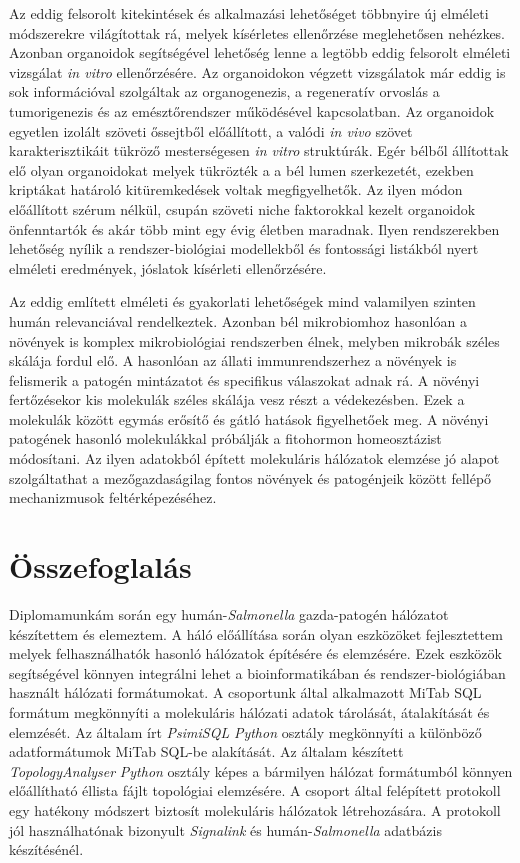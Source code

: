 \documentclass[a4paper,12pt]{article}
\begin{document}
		Az eddig felsorolt kitekintések és alkalmazási lehetőséget többnyire új elméleti módszerekre világítottak rá, melyek kísérletes ellenőrzése meglehetősen nehézkes. Azonban organoidok segítségével lehetőség lenne a legtöbb eddig felsorolt elméleti vizsgálat \textit{in vitro} ellenőrzésére. Az organoidokon végzett vizsgálatok már eddig is sok információval szolgáltak az organogenezis, a regeneratív orvoslás a tumorigenezis és az emésztőrendszer működésével kapcsolatban. Az organoidok egyetlen izolált szöveti őssejtből előállított, a valódi \textit{in vivo} szövet karakterisztikáit tükröző mesterségesen \textit{in vitro} struktúrák. \cite{organoid}
		Egér bélből állítottak elő olyan organoidokat melyek tükrözték a a bél lumen szerkezetét, ezekben kriptákat határoló kitüremkedések voltak megfigyelhetők. Az ilyen módon előállított szérum nélkül, csupán szöveti niche faktorokkal kezelt organoidok önfenntartók és akár több mint egy évig életben maradnak. \cite{organoid} Ilyen rendszerekben lehetőség nyílik a rendszer-biológiai modellekből és fontossági listákból nyert elméleti eredmények, jóslatok kísérleti ellenőrzésére.
		
		Az eddig említett elméleti és gyakorlati lehetőségek mind valamilyen szinten humán relevanciával rendelkeztek. Azonban bél mikrobiomhoz hasonlóan a növények is komplex mikrobiológiai rendszerben élnek, melyben mikrobák széles skálája fordul elő. 
		A hasonlóan az állati immunrendszerhez a növények is felismerik a patogén mintázatot és specifikus válaszokat adnak rá. A növényi fertőzésekor kis molekulák széles skálája vesz részt a védekezésben. Ezek a molekulák között egymás erősítő és gátló hatások figyelhetőek meg. A növényi patogének hasonló molekulákkal próbálják a fitohormon homeosztázist módosítani. \cite{discussion_plant_network} Az ilyen adatokból épített molekuláris hálózatok elemzése jó alapot szolgáltathat a mezőgazdaságilag fontos növények és patogénjeik között fellépő mechanizmusok feltérképezéséhez.
		
		\pagebreak

\section{Összefoglalás}
		
		Diplomamunkám során egy humán-\textit{Salmonella} gazda-patogén hálózatot készítettem és elemeztem. A háló előállítása során olyan eszközöket fejlesztettem melyek felhasználhatók hasonló hálózatok építésére és elemzésére. Ezek eszközök segítségével könnyen integrálni lehet a bioinformatikában és rendszer-biológiában használt hálózati formátumokat. A csoportunk által alkalmazott MiTab SQL formátum megkönnyíti a molekuláris hálózati adatok tárolását, átalakítását és elemzését. Az általam írt \textit{PsimiSQL} \textit{Python} osztály megkönnyíti a különböző adatformátumok MiTab SQL-be alakítását. Az általam készített \textit{TopologyAnalyser} \textit{Python} osztály képes a  bármilyen hálózat formátumból könnyen előállítható éllista fájlt topológiai elemzésére.  A csoport által felépített protokoll egy hatékony módszert biztosít molekuláris hálózatok létrehozására. A protokoll jól használhatónak bizonyult \textit{Signalink} és humán-\textit{Salmonella} adatbázis készítésénél.
		
\end{document}
